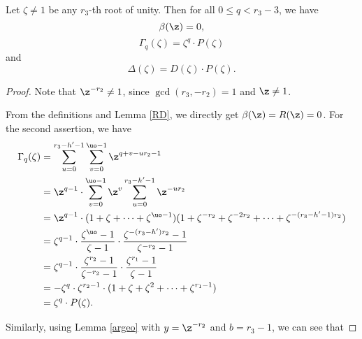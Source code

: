 \begin{lemma}
Let $\zeta\neq 1$ be any $r_3$-th root of unity. Then for all $0\leq q<r_3-3$, we have $$\beta(\z)=0,$$ $$\Gamma_q(\zeta)=\zeta^{q}\cdot P(\zeta)$$ and $$\Delta(\zeta)=D(\zeta)\cdot P(\zeta).$$
\end{lemma}
\begin{proof}
Note that $\z^{-r_2}\neq 1$, since $\gcd(r_3,-r_2)=1$ and $\z\neq1$.

From the definitions and Lemma \ref{RD}, we directly get $\beta(\z)=R(\z)=0$. For the second assertion, we have
\begin{equation*}\label{Gamma}
\begin{split}
\Gamma_q(\zeta)&=\sum_{u=0}^{r_3-h'-1}\sum_{v=0}^{\uo-1}\z^{q+v-ur_2-1}\\
&=\z^{q-1}\cdot\sum_{v=0}^{\uo-1}\z^{v}\sum_{u=0}^{r_3-h'-1}\z^{-ur_2}\\
&=\z^{q-1}\cdot(1+\zeta+\dots+\zeta^{\uo-1})(1+\zeta^{-r_2}+\zeta^{-2r_2}+\dots+\zeta^{-(r_3-h'-1)r_2})\\
&=\zeta^{q-1}\cdot\frac{\zeta^{\uo}-1}{\zeta-1}\cdot \frac{\zeta^{-(r_3-h')r_2}-1}{\zeta^{-r_2}-1}\\
&=\zeta^{q-1}\cdot\frac{\zeta^{r_2}-1}{\zeta^{-r_2}-1}\cdot \frac{\zeta^{r_1}-1}{\zeta-1}\\
&=-\zeta^{q}\cdot \zeta^{r_2-1}\cdot (1+\zeta+\zeta^2+\dots+\zeta^{r_1-1})\\
&=\zeta^{q}\cdot P(\zeta).
\end{split}
\end{equation*}

Similarly, using Lemma \ref{argeo} with $y=\z^{-r_2}$ and $b=r_3-1$, we can see that


\end{proof}
